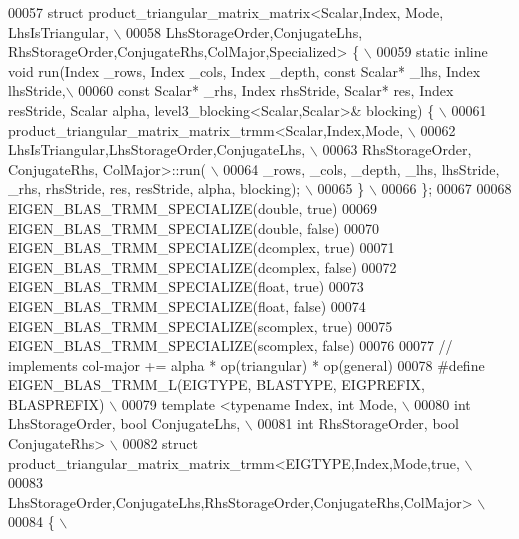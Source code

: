 \begin{DoxyCode}
00057 \textcolor{preprocessor}{struct product\_triangular\_matrix\_matrix<Scalar,Index, Mode, LhsIsTriangular, \(\backslash\)}
00058 \textcolor{preprocessor}{           LhsStorageOrder,ConjugateLhs, RhsStorageOrder,ConjugateRhs,ColMajor,Specialized> \{ \(\backslash\)}
00059 \textcolor{preprocessor}{  static inline void run(Index \_rows, Index \_cols, Index \_depth, const Scalar* \_lhs, Index lhsStride,\(\backslash\)}
00060 \textcolor{preprocessor}{    const Scalar* \_rhs, Index rhsStride, Scalar* res, Index resStride, Scalar alpha,
       level3\_blocking<Scalar,Scalar>& blocking) \{ \(\backslash\)}
00061 \textcolor{preprocessor}{      product\_triangular\_matrix\_matrix\_trmm<Scalar,Index,Mode, \(\backslash\)}
00062 \textcolor{preprocessor}{        LhsIsTriangular,LhsStorageOrder,ConjugateLhs, \(\backslash\)}
00063 \textcolor{preprocessor}{        RhsStorageOrder, ConjugateRhs, ColMajor>::run( \(\backslash\)}
00064 \textcolor{preprocessor}{        \_rows, \_cols, \_depth, \_lhs, lhsStride, \_rhs, rhsStride, res, resStride, alpha, blocking); \(\backslash\)}
00065 \textcolor{preprocessor}{  \} \(\backslash\)}
00066 \textcolor{preprocessor}{\};}
00067 
00068 EIGEN\_BLAS\_TRMM\_SPECIALIZE(\textcolor{keywordtype}{double}, \textcolor{keyword}{true})
00069 EIGEN\_BLAS\_TRMM\_SPECIALIZE(\textcolor{keywordtype}{double}, \textcolor{keyword}{false})
00070 EIGEN\_BLAS\_TRMM\_SPECIALIZE(dcomplex, \textcolor{keyword}{true})
00071 EIGEN\_BLAS\_TRMM\_SPECIALIZE(dcomplex, \textcolor{keyword}{false})
00072 EIGEN\_BLAS\_TRMM\_SPECIALIZE(\textcolor{keywordtype}{float}, \textcolor{keyword}{true})
00073 EIGEN\_BLAS\_TRMM\_SPECIALIZE(\textcolor{keywordtype}{float}, \textcolor{keyword}{false})
00074 EIGEN\_BLAS\_TRMM\_SPECIALIZE(scomplex, \textcolor{keyword}{true})
00075 EIGEN\_BLAS\_TRMM\_SPECIALIZE(scomplex, \textcolor{keyword}{false})
00076 
00077 \textcolor{comment}{// implements col-major += alpha * op(triangular) * op(general)}
00078 \textcolor{preprocessor}{#define EIGEN\_BLAS\_TRMM\_L(EIGTYPE, BLASTYPE, EIGPREFIX, BLASPREFIX) \(\backslash\)}
00079 \textcolor{preprocessor}{template <typename Index, int Mode, \(\backslash\)}
00080 \textcolor{preprocessor}{          int LhsStorageOrder, bool ConjugateLhs, \(\backslash\)}
00081 \textcolor{preprocessor}{          int RhsStorageOrder, bool ConjugateRhs> \(\backslash\)}
00082 \textcolor{preprocessor}{struct product\_triangular\_matrix\_matrix\_trmm<EIGTYPE,Index,Mode,true, \(\backslash\)}
00083 \textcolor{preprocessor}{         LhsStorageOrder,ConjugateLhs,RhsStorageOrder,ConjugateRhs,ColMajor> \(\backslash\)}
00084 \textcolor{preprocessor}{\{ \(\backslash\)}

\end{DoxyCode}
